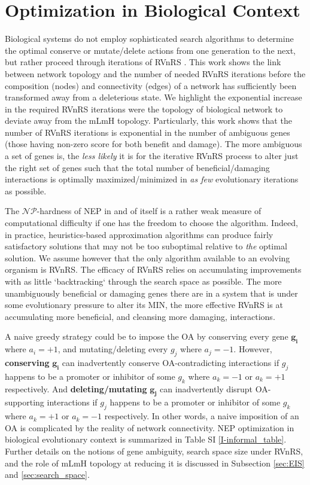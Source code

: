 \documentclass[12pt]{article}
\newcommand{\myC}[1]{{$\mathcal{#1}$}}
\begin{document}
\section{Optimization in Biological Context}\label{opt_in_bio_context}
Biological systems do not employ sophisticated search algorithms to determine the optimal conserve or mutate/delete actions from one generation to the next, but rather proceed through iterations of RVnRS \cite{carvunis_proto-genes_2012}. This work shows the link between network topology and the number of needed RVnRS iterations before the composition (nodes) and connectivity (edges) of a network has sufficiently been transformed away from a deleterious state. We highlight the exponential increase in the required RVnRS iterations were the topology of biological network to deviate away from the mLmH topology. Particularly, this work shows that the number of RVnRS iterations is exponential in the number of ambiguous genes (those having non-zero score for both benefit and damage). The more ambiguous a set of genes is, the \textit{less likely} it is for the iterative RVnRS process to alter just the right set of genes such that the total number of beneficial/damaging interactions is optimally maximized/minimized in \textit{as few} evolutionary iterations as possible. 

The \myC{NP}-hardness of NEP in and of itself is a rather weak measure of computational difficulty if one has the freedom to choose the algorithm. Indeed, in practice, heuristics-based approximation algorithms can produce fairly satisfactory solutions that may not be too suboptimal relative to \textit{the} optimal solution. We assume however that the only algorithm available to an evolving organism is RVnRS. 
The efficacy of RVnRS relies on accumulating improvements with as little `backtracking` through the search space as possible. The more unambiguously beneficial or damaging genes there are in a system that is under some evolutionary pressure to alter its MIN, the more effective RVnRS is at accumulating more beneficial, and cleansing more damaging, interactions.

A naive greedy strategy could be to impose the OA by conserving every gene $\boldsymbol{g_i}$ where $a_i = +1$, and mutating/deleting every $g_j$ where $a_j=-1$. However, \textbf{conserving} $\boldsymbol{g_i}$ can inadvertently conserve OA-contradicting interactions if $g_j$ happens to be a promoter or inhibitor of some $g_k$ where $a_k=-1$ or $a_k=+1$ respectively. And \textbf{deleting/mutating} $\boldsymbol{g_j}$ can inadvertently disrupt OA-supporting interactions if $g_j$ happens to be a promoter or inhibitor of some $g_k$ where $a_k=+1$ or $a_k=-1$ respectively. In other words, a naive imposition of an OA is complicated by the reality of network connectivity. NEP optimization in biological evolutionary context is summarized in Table SI \ref{I-informal_table}. Further details on the notions of gene ambiguity, search space size under RVnRS, and the role of mLmH topology at reducing it is discussed in Subsection \ref{sec:EIS} and \ref{sec:search_space}.
\end{document}
